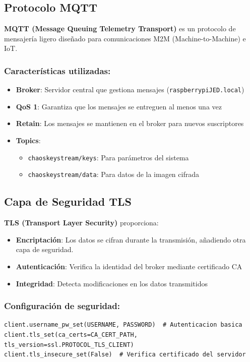 \documentclass[12pt,a4paper]{article}
\begin{document}
	\subsection{Protocolo MQTT}
	
	\textbf{MQTT (Message Queuing Telemetry Transport)} es un protocolo de mensajería ligero diseñado para comunicaciones M2M (Machine-to-Machine) e IoT.
	
	\subsubsection*{Características utilizadas:}
	\begin{itemize}
		\item \textbf{Broker}: Servidor central que gestiona mensajes (\texttt{raspberrypiJED.local})
		\item \textbf{QoS 1}: Garantiza que los mensajes se entreguen al menos una vez
		\item \textbf{Retain}: Los mensajes se mantienen en el broker para nuevos suscriptores
		\item \textbf{Topics}:
		\begin{itemize}
			\item \texttt{chaoskeystream/keys}: Para parámetros del sistema
			\item \texttt{chaoskeystream/data}: Para datos de la imagen cifrada
		\end{itemize}
	\end{itemize}
	
	\subsection{Capa de Seguridad TLS}
	
	\textbf{TLS (Transport Layer Security)} proporciona:
	\begin{itemize}
		\item \textbf{Encriptación}: Los datos se cifran durante la transmisión, añadiendo otra capa de seguridad.
		\item \textbf{Autenticación}: Verifica la identidad del broker mediante certificado CA
		\item \textbf{Integridad}: Detecta modificaciones en los datos transmitidos
	\end{itemize}
	
	\subsubsection*{Configuración de seguridad:}
	\begin{lstlisting}
client.username_pw_set(USERNAME, PASSWORD)  # Autenticacion basica
client.tls_set(ca_certs=CA_CERT_PATH, tls_version=ssl.PROTOCOL_TLS_CLIENT)
client.tls_insecure_set(False)  # Verifica certificado del servidor
	\end{lstlisting}
	
\end{document}
